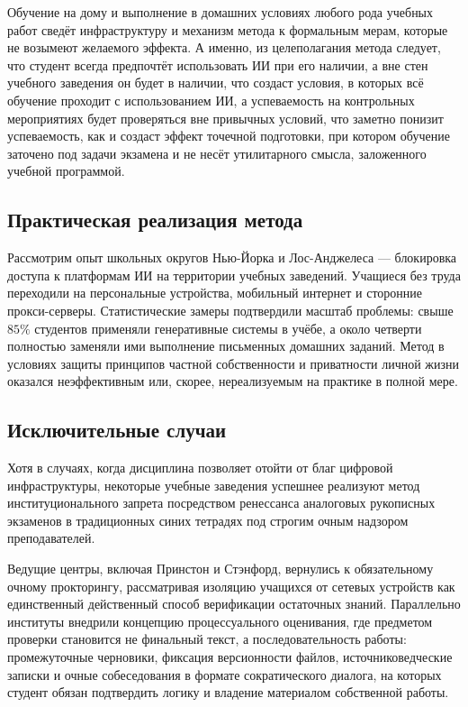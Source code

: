 \documentclass[12pt,a4paper]{article}
\begin{document}
Обучение на дому и выполнение в домашних условиях любого рода учебных работ 
сведёт инфраструктуру и механизм метода к формальным мерам, которые не возымеют 
желаемого эффекта. А именно, из целеполагания метода следует, что студент всегда 
предпочтёт использовать ИИ при его наличии, а вне стен учебного заведения он будет 
в наличии, что создаст условия, в которых всё обучение проходит с использованием ИИ, 
а успеваемость на контрольных мероприятиях будет проверяться вне привычных условий, что 
заметно понизит успеваемость, как и создаст эффект точечной подготовки, при котором
обучение заточено под задачи экзамена и не несёт утилитарного смысла, заложенного 
учебной программой. 

\subsection{Практическая реализация метода}

Рассмотрим опыт школьных округов Нью-Йорка и Лос-Анджелеса — блокировка доступа к 
платформам ИИ на территории учебных заведений. Учащиеся без труда переходили на 
персональные устройства, мобильный интернет и сторонние прокси-серверы. Статистические 
замеры подтвердили масштаб проблемы: свыше $85\%$ студентов применяли генеративные 
системы в учёбе, а около четверти полностью заменяли ими выполнение письменных 
домашних заданий. Метод в условиях защиты принципов 
частной собственности и приватности личной жизни оказался неэффективным или, скорее, 
нереализуемым на практике в полной мере. 

\subsection{Исключительные случаи}

Хотя в случаях, когда дисциплина позволяет 
отойти от благ цифровой инфраструктуры, некоторые учебные заведения успешнее реализуют
метод институционального запрета посредством ренессанса аналоговых рукописных экзаменов 
в традиционных синих тетрадях под строгим очным надзором преподавателей. 

Ведущие центры, включая Принстон и Стэнфорд, вернулись к обязательному очному 
прокторингу, рассматривая изоляцию учащихся от сетевых устройств как единственный 
действенный способ верификации остаточных знаний. Параллельно институты внедрили 
концепцию процессуального оценивания, где предметом проверки становится не финальный 
текст, а последовательность работы: промежуточные черновики, фиксация версионности 
файлов, источниковедческие записки и очные собеседования в формате сократического 
диалога, на которых студент обязан подтвердить логику и владение материалом 
собственной работы.
\end{document}
